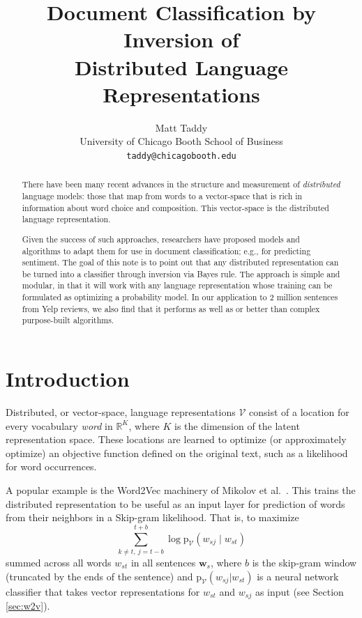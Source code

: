 \documentclass[11pt]{article}
\title{Document Classification by Inversion of \\Distributed Language Representations}
\author{Matt Taddy \\
  University of Chicago Booth School of Business \\
  {\tt taddy@chicagobooth.edu} \\}
\date{}
\begin{document}
\maketitle
\begin{abstract}
There have been many recent advances in the structure and measurement of {\it distributed} language models: those that map from words to a vector-space that is rich in information about word choice and composition.  This vector-space is the distributed language representation.    

Given the success of such approaches,  researchers have proposed
models and algorithms to adapt them for use in document classification; e.g., for predicting sentiment.  The goal of this note is to point out that any distributed  representation can be turned into a classifier through inversion via Bayes rule.  
The approach is simple and modular, in that it will work with any language representation whose training can be formulated as optimizing a probability model. In our application to 2 million sentences from Yelp reviews, we also find that it performs as well as or better than  complex purpose-built algorithms. \end{abstract}

\section{Introduction}

Distributed, or vector-space, language representations $\mathcal{V}$ consist
of a location for every vocabulary {\it word} in $\mathds{R}^K$, where $K$ is
the dimension of the latent representation space.  These locations are learned
to optimize (or approximately optimize) an objective function defined on the
original text, such as a likelihood for word occurrences.

A popular example is the Word2Vec machinery of
Mikolov et al.~.  This trains the distributed
representation to be useful as an input layer for prediction of words from
their neighbors in a Skip-gram likelihood.  That is, to maximize
\begin{equation}\label{eq:skipgram}
\sum_{k\neq t,~j=t-b}^{t+b} \log\mathrm{p}_{\mathcal{V}}(w_{sj}\mid w_{st})
\end{equation}
summed across all words $w_{st}$ in all sentences $\mathbf{w}_s$, where $b$ is
the skip-gram window (truncated by the ends of the
sentence) and  $\mathrm{p}_{\mathcal{V}}(w_{sj}| w_{st})$ is a neural network
classifier that takes vector representations for $w_{st}$ and $w_{sj}$
as input (see Section \ref{sec:w2v}).
\end{document}
